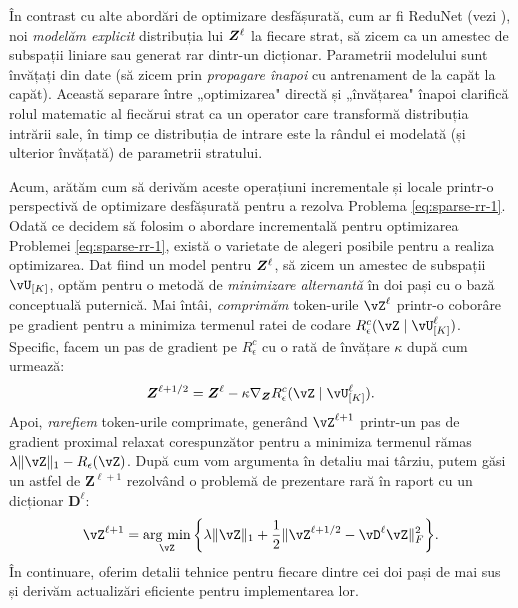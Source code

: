 \documentclass[../../book-main_ro.tex]{subfiles}
\begin{document}
\begin{remark}
    În contrast cu alte abordări de optimizare desfășurată, cum ar fi ReduNet (vezi ), noi \textit{modelăm explicit} distribuția lui $\bm{Z}^\ell$ la fiecare strat, să zicem ca un amestec de subspații liniare sau generat rar dintr-un dicționar. Parametrii modelului sunt învățați din date (să zicem prin \textit{propagare înapoi} cu antrenament de la capăt la capăt). Această separare între „optimizarea" directă și
„învățarea" înapoi clarifică rolul matematic al fiecărui strat ca un operator
care transformă distribuția intrării sale, în timp ce distribuția de intrare este la rândul ei modelată (și ulterior învățată) de parametrii stratului.
\end{remark}

Acum, arătăm cum să derivăm aceste operațiuni incrementale și locale printr-o perspectivă de optimizare desfășurată pentru a rezolva Problema \eqref{eq:sparse-rr-1}. Odată ce decidem să folosim o abordare incrementală pentru optimizarea Problemei
\eqref{eq:sparse-rr-1}, există o varietate de alegeri posibile pentru a realiza optimizarea. Dat fiind un model pentru $\bm{Z}^\ell$, să zicem un amestec de subspații $\vU_{[K]}$, optăm pentru o metodă de \textit{minimizare alternantă} în doi pași cu o bază conceptuală puternică. Mai întâi, \textit{comprimăm} token-urile $\vZ^{\ell}$ printr-o coborâre pe gradient pentru a minimiza termenul ratei de codare $R^c_\epsilon (\vZ \mid \vU_{[K]}^\ell)$. Specific, facem un pas de gradient pe $R^c_\epsilon$ cu o rată de învățare $\kappa$ după cum urmează:
\begin{align}\label{eq:Z l+1/2}
    \bm Z^{\ell+1/2} = \bm Z^\ell - \kappa \nabla_{\bm Z} R^c_\epsilon (\vZ \mid \vU_{[K]}^\ell). 
\end{align}
Apoi, \textit{rarefiem} token-urile comprimate, generând \(\vZ^{\ell + 1}\) printr-un pas de gradient proximal relaxat corespunzător pentru a minimiza termenul rămas $\lambda \norm{\vZ}_{1} - R_{\epsilon}(\vZ)$. După cum vom argumenta în detaliu mai târziu, putem găsi un astfel de $\bm Z^{\ell+1}$ rezolvând o problemă de prezentare rară în raport cu un dicționar $\bm D^\ell$:
\begin{equation}\label{eq:Z l+1}
  \vZ^{\ell+1} = \argmin_{{\vZ}}  \bigg\{\lambda \norm{\vZ}_1 + \frac{1}{2}\norm{\vZ^{\ell + 1/2} - \vD^{\ell} {\vZ}}_F^2\bigg\}.
\end{equation}
În continuare, oferim detalii tehnice pentru fiecare dintre cei doi pași de mai sus și derivăm actualizări eficiente pentru implementarea lor.
\end{document}
